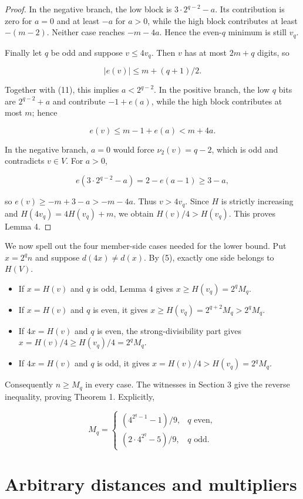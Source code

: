 \documentclass[11pt]{article}
\numberwithin{equation}{section}
\begin{document}
\begin{proof}
In the negative branch, the low block is $3\cdot2^{q-2}-a$. Its contribution is zero for
$a=0$ and at least $-a$ for $a>0$, while the high block contributes at least $-(m-2)$.
Neither case reaches $-m-4a$. Hence the even-$q$ minimum is still $v_q$.

Finally let $q$ be odd and suppose $v\leq4v_q$. Then $v$ has at most $2m+q$ digits, so

\[
|e(v)|\leq m+(q+1)/2.
\]

Together with (11), this implies $a<2^{q-2}$. In the positive branch, the low $q$ bits are
$2^{q-2}+a$ and contribute $-1+e(a)$, while the high block contributes at most $m$; hence

\[
e(v)\leq m-1+e(a)<m+4a.
\]

In the negative branch, $a=0$ would force $\nu_2(v)=q-2$, which is odd and contradicts
$v\in V$. For $a>0$,

\[
e(3\cdot2^{q-2}-a)=2-e(a-1)\geq3-a,
\]

so $e(v)\geq-m+3-a>-m-4a$. Thus $v>4v_q$. Since $H$ is strictly increasing and
$H(4v_q)=4H(v_q)+m$, we obtain $H(v)/4>H(v_q)$. This proves Lemma 4.
\end{proof}


We now spell out the four member-side cases needed for the lower bound. Put $x=2^qn$ and suppose
$d(4x)\neq d(x)$. By (5), exactly one side belongs to $H(V)$.

\begin{itemize}
\item If $x=H(v)$ and $q$ is odd, Lemma 4 gives
$x\geq H(v_q)=2^qM_q$.
\item If $x=H(v)$ and $q$ is even, it gives
$x\geq H(v_q)=2^{q+2}M_q>2^qM_q$.
\item If $4x=H(v)$ and $q$ is even, the strong-divisibility part gives
$x=H(v)/4\geq H(v_q)/4=2^qM_q$.
\item If $4x=H(v)$ and $q$ is odd, it gives
$x=H(v)/4>H(v_q)=2^qM_q$.

\end{itemize}

Consequently $n\geq M_q$ in every case. The witnesses in Section 3 give the reverse inequality,
proving Theorem 1. Explicitly,

\[
M_q=\begin{cases}
(4^{2^q-1}-1)/9,&q\text{ even},\\
(2\cdot4^{2^q}-5)/9,&q\text{ odd}.
\end{cases}
\]

\section{Arbitrary distances and multipliers}
\end{document}
